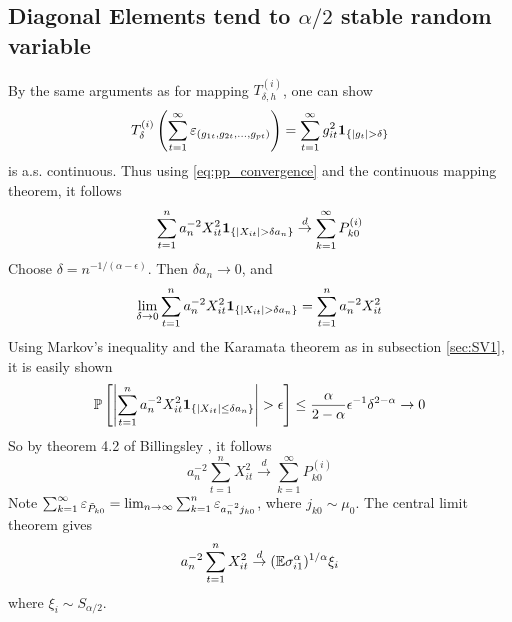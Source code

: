 \documentclass{article}
\begin{document}
\subsection[Diagonal Elements tend to alpha/2 stable random variable]{Diagonal
  Elements tend to $\alpha/2$ stable random variable}\label{sec:SV2}
By the same arguments as for mapping $T^{(i)}_{\delta, h}$, one can
show
\[
T^{(i)}_{\delta} \left(\sum_{t=1}^\infty \pop{(g_{1t}, g_{2t},
    \dots, g_{pt})}\right) = \sum_{t=1}^\infty g_{it}^2
\1{|g_{t}|> \delta}
\]
is a.s. continuous. Thus using \eqref{eq:pp_convergence} and
the continuous mapping theorem, it follows
\[
\sum_{t=1}^n a_n^{-2} X_{it}^2 \mathbf{1}_{\{|X_{it}| > \delta a_n\}}
\overset{d}{\to} \sum_{k=1}^\infty P^{(i)}_{k0}
\]
Choose $\delta = n^{-1/(\alpha - \epsilon)}$. Then $\delta a_n \to 0$,
and
\[
\lim_{\delta \to 0}\sum_{t=1}^n a_n^{-2} X_{it}^2 \mathbf{1}_{\{|X_{it}| > \delta
  a_n\}} = \sum_{t=1}^n a_n^{-2} X_{it}^2
\]
Using Markov's inequality and the Karamata theorem as in subsection
\ref{sec:SV1}, it is easily shown
\[
\P\left[
  \left|
\sum_{t=1}^n a_n^{-2} X_{it}^2 \1{|X_{it}| \leq \delta a_n}
\right|> \epsilon
\right] \leq {\alpha \over 2 - \alpha} \epsilon^{-1} \delta^{2-\alpha}
\to 0
\]
So by theorem 4.2 of Billingsley \cite{billingsley1968convergence}, it follows
\[
a_n^{-2} \sum_{t=1}^n  X_{it}^2 \overset{d}{\to} \sum_{k=1}^\infty P^{(i)}_{k0}
\]
Note $\sum_{k=1}^\infty \varepsilon_{\tilde P_{k0}} = \lim_{n \to
  \infty}\sum_{k=1}^n \varepsilon_{a_n^{-2} j_{k0}}$, where $j_{k0} \sim
\mu_0$. The central limit theorem gives
\[
a_n^{-2} \sum_{t=1}^n  X_{it}^2 \overset{d}{\to} (\mathbb{E}
\sigma_{i1}^\alpha)^{1/\alpha} \xi_{i}
\]
where $\xi_i \sim S_{\alpha/2}$.



\end{document}
